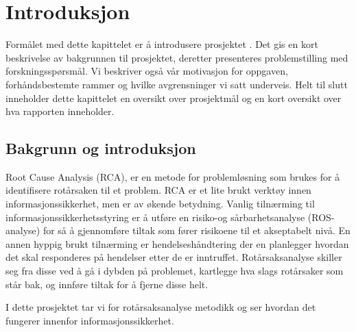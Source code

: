 \chapter{Introduksjon}
\label{kap:introduksjon}
Formålet med dette kapittelet er å introdusere prosjektet . Det gis en kort beskrivelse av bakgrunnen til prosjektet, deretter presenteres problemstilling med forskningsspørsmål. Vi beskriver også vår motivasjon for oppgaven,  forhåndsbestemte rammer og hvilke avgrensninger vi satt underveis. Helt til slutt inneholder dette kapittelet en oversikt over prosjektmål og en kort oversikt over hva rapporten inneholder.


\section{Bakgrunn og introduksjon}
\label{sec:bakgrunn}
Root Cause Analysis (RCA), er en metode for problemløsning som brukes for å identifisere rotårsaken til et problem. RCA er et lite brukt verktøy innen informasjonssikkerhet, men er av økende betydning. Vanlig tilnærming til informasjonssikkerhetsstyring er å utføre en risiko-og sårbarhetsanalyse (ROS-analyse) for så å gjennomføre tiltak som fører risikoene til et akseptabelt nivå. En annen hyppig brukt tilnærming er hendelseshåndtering der en planlegger hvordan det skal responderes på hendelser etter de er inntruffet. Rotårsaksanalyse skiller seg fra disse ved å gå i dybden på problemet, kartlegge hva slags rotårsaker som står bak, og innføre tiltak for å fjerne disse helt. 

I dette prosjektet tar vi for rotårsaksanalyse metodikk og ser hvordan det fungerer innenfor informasjonssikkerhet. 